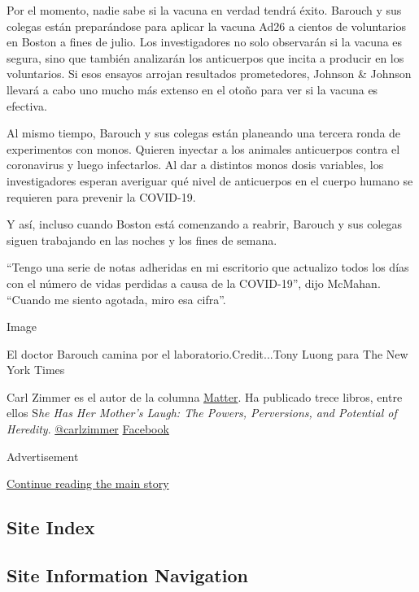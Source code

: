 Por el momento, nadie sabe si la vacuna en verdad tendrá éxito. Barouch
y sus colegas están preparándose para aplicar la vacuna Ad26 a cientos
de voluntarios en Boston a fines de julio. Los investigadores no solo
observarán si la vacuna es segura, sino que también analizarán los
anticuerpos que incita a producir en los voluntarios. Si esos ensayos
arrojan resultados prometedores, Johnson \& Johnson llevará a cabo uno
mucho más extenso en el otoño para ver si la vacuna es efectiva.

Al mismo tiempo, Barouch y sus colegas están planeando una tercera ronda
de experimentos con monos. Quieren inyectar a los animales anticuerpos
contra el coronavirus y luego infectarlos. Al dar a distintos monos
dosis variables, los investigadores esperan averiguar qué nivel de
anticuerpos en el cuerpo humano se requieren para prevenir la COVID-19.

Y así, incluso cuando Boston está comenzando a reabrir, Barouch y sus
colegas siguen trabajando en las noches y los fines de semana.

``Tengo una serie de notas adheridas en mi escritorio que actualizo
todos los días con el número de vidas perdidas a causa de la COVID-19'',
dijo McMahan. ``Cuando me siento agotada, miro esa cifra''.

Image

El doctor Barouch camina por el laboratorio.Credit...Tony Luong para The
New York Times

Carl Zimmer es el autor de la columna
\href{https://www.nytimes.com/column/matter}{Matter}. Ha publicado trece
libros, entre ellos S\emph{he Has Her Mother's Laugh: The Powers,
Perversions, and Potential of Heredity}.
\href{https://twitter.com/carlzimmer}{@carlzimmer} \textbar{}
\href{https://www.facebook.com/carlzimmerauthor}{Facebook}

Advertisement

\protect\hyperlink{after-bottom}{Continue reading the main story}

\hypertarget{site-index}{%
\subsection{Site Index}\label{site-index}}

\hypertarget{site-information-navigation}{%
\subsection{Site Information
Navigation}\label{site-information-navigation}}

